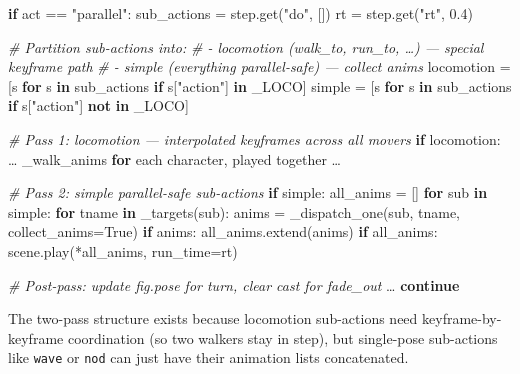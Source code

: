 \documentclass[
  11pt,
]{book}
\newenvironment{Shaded}{}{}
\newcommand{\CommentTok}[1]{\textcolor[rgb]{0.38,0.63,0.69}{\textit{#1}}}
\newcommand{\ControlFlowTok}[1]{\textcolor[rgb]{0.00,0.44,0.13}{\textbf{#1}}}
\newcommand{\FloatTok}[1]{\textcolor[rgb]{0.25,0.63,0.44}{#1}}
\newcommand{\KeywordTok}[1]{\textcolor[rgb]{0.00,0.44,0.13}{\textbf{#1}}}
\newcommand{\NormalTok}[1]{#1}
\newcommand{\OperatorTok}[1]{\textcolor[rgb]{0.40,0.40,0.40}{#1}}
\newcommand{\StringTok}[1]{\textcolor[rgb]{0.25,0.44,0.63}{#1}}
\newcommand{\VariableTok}[1]{\textcolor[rgb]{0.10,0.09,0.49}{#1}}
\begin{document}
\begin{Shaded}
\begin{Highlighting}[]
\ControlFlowTok{if}\NormalTok{ act }\OperatorTok{==} \StringTok{"parallel"}\NormalTok{:}
\NormalTok{    sub\_actions }\OperatorTok{=}\NormalTok{ step.get(}\StringTok{"do"}\NormalTok{, [])}
\NormalTok{    rt }\OperatorTok{=}\NormalTok{ step.get(}\StringTok{"rt"}\NormalTok{, }\FloatTok{0.4}\NormalTok{)}

    \CommentTok{\# Partition sub{-}actions into:}
    \CommentTok{\#  {-} locomotion (walk\_to, run\_to, …) — special keyframe path}
    \CommentTok{\#  {-} simple (everything parallel{-}safe) — collect anims}
\NormalTok{    locomotion }\OperatorTok{=}\NormalTok{ [s }\ControlFlowTok{for}\NormalTok{ s }\KeywordTok{in}\NormalTok{ sub\_actions }\ControlFlowTok{if}\NormalTok{ s[}\StringTok{"action"}\NormalTok{] }\KeywordTok{in}\NormalTok{ \_LOCO]}
\NormalTok{    simple     }\OperatorTok{=}\NormalTok{ [s }\ControlFlowTok{for}\NormalTok{ s }\KeywordTok{in}\NormalTok{ sub\_actions }\ControlFlowTok{if}\NormalTok{ s[}\StringTok{"action"}\NormalTok{] }\KeywordTok{not} \KeywordTok{in}\NormalTok{ \_LOCO]}

    \CommentTok{\# Pass 1: locomotion — interpolated keyframes across all movers}
    \ControlFlowTok{if}\NormalTok{ locomotion:}
\NormalTok{        … \_walk\_anims }\ControlFlowTok{for}\NormalTok{ each character, played together …}

    \CommentTok{\# Pass 2: simple parallel{-}safe sub{-}actions}
    \ControlFlowTok{if}\NormalTok{ simple:}
\NormalTok{        all\_anims }\OperatorTok{=}\NormalTok{ []}
        \ControlFlowTok{for}\NormalTok{ sub }\KeywordTok{in}\NormalTok{ simple:}
            \ControlFlowTok{for}\NormalTok{ tname }\KeywordTok{in}\NormalTok{ \_targets(sub):}
\NormalTok{                anims }\OperatorTok{=}\NormalTok{ \_dispatch\_one(sub, tname, collect\_anims}\OperatorTok{=}\VariableTok{True}\NormalTok{)}
                \ControlFlowTok{if}\NormalTok{ anims:}
\NormalTok{                    all\_anims.extend(anims)}
        \ControlFlowTok{if}\NormalTok{ all\_anims:}
\NormalTok{            scene.play(}\OperatorTok{*}\NormalTok{all\_anims, run\_time}\OperatorTok{=}\NormalTok{rt)}

    \CommentTok{\# Post{-}pass: update fig.pose for turn, clear cast for fade\_out}
\NormalTok{    …}
    \ControlFlowTok{continue}
\end{Highlighting}
\end{Shaded}

The two-pass structure exists because locomotion sub-actions need
keyframe-by-keyframe coordination (so two walkers stay in step), but
single-pose sub-actions like \texttt{wave} or \texttt{nod} can just have
their animation lists concatenated.
\end{document}
